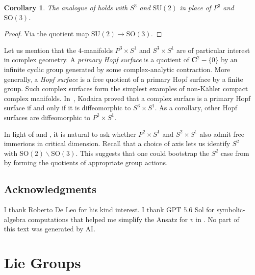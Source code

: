 \documentclass[a4paper,10pt,leqno]{article}
\numberwithin{equation}{section}
\theoremstyle{plain}
\newtheorem{cor}[thm]{Corollary}
\theoremstyle{definition}
\theoremstyle{remark}
\newcommand{\bb}{\mathbf}
\newcommand{\sapphire}[1]{\textcolor{sapphire}{#1}}
\newcommand{\dfemph}[1]{\sapphire{\emph{#1}}}
\newcommand{\SU}{\mathrm{SU}}
\newcommand{\SO}{\mathrm{SO}}
\begin{document}
\begin{cor}\label{cor:main}
The analogue of  holds with $S^3$ and $\SU(2)$ in place of $P^3$ and $\SO(3)$.
\end{cor}

\begin{proof}
Via the quotient map $\SU(2) \to \SO(3)$.
\end{proof}

Let us mention that the $4$-manifolds $P^3 \times S^1$ and $S^3 \times S^1$ are of particular interest in complex geometry.
A \dfemph{primary Hopf surface} is a quotient of $\bb{C}^2 - \{0\}$ by an infinite cyclic group generated by some complex-analytic contraction.
More generally, a \dfemph{Hopf surface} is a free quotient of a primary Hopf surface by a finite group.
Such complex surfaces form the simplest examples of non-K\"ahler compact complex manifolds.
In~\cite{kodaira}, Kodaira proved that a complex surface is a primary Hopf surface if and only if it is diffeomorphic to $S^3 \times S^1$.
As a corollary, other Hopf surfaces are diffeomorphic to $P^3 \times S^1$.

In light of  and , it is natural to ask whether $P^2 \times S^1$ and $S^2 \times S^1$ also admit free immerions in critical dimension.
Recall that a choice of axis lets us identify $S^2$ with $\SO(2)\backslash\SO(3)$.
This suggests that one could bootstrap the $S^2$ case from  by forming the quotients of appropriate group actions.


\subsection{Acknowledgments}

I thank Roberto De Leo for his kind interest.
I thank GPT 5.6 Sol for symbolic-algebra computations that helped me simplify the Ansatz for $v$ in .
No part of this text was generated by AI.

\section{Lie Groups}
\end{document}
